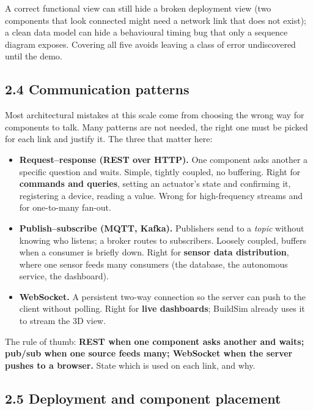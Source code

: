 \documentclass[
  11pt,
]{article}
\providecommand{\tightlist}{%
  \setlength{\itemsep}{0pt}\setlength{\parskip}{0pt}}
\begin{document}
A correct functional view can still hide a broken deployment view (two
components that look connected might need a network link that does not
exist); a clean data model can hide a behavioural timing bug that only a
sequence diagram exposes. Covering all five avoids leaving a
class of error undiscovered until the demo.

\hypertarget{communication-patterns}{%
\subsection{2.4 Communication patterns}\label{communication-patterns}}

Most architectural mistakes at this scale come from choosing the wrong
way for components to talk. Many patterns are not needed, the right one must be picked for each link and justify it. The three that
matter here:

\begin{itemize}
\tightlist
\item
  \textbf{Request--response (REST over HTTP).} One component asks
  another a specific question and waits. Simple, tightly coupled, no
  buffering. Right for \textbf{commands and queries}, setting an
  actuator's state and confirming it, registering a device, reading a
  value. Wrong for high-frequency streams and for one-to-many fan-out.
\item
  \textbf{Publish--subscribe (MQTT, Kafka).} Publishers send to a
  \emph{topic} without knowing who listens; a broker routes to
  subscribers. Loosely coupled, buffers when a consumer is briefly down.
  Right for \textbf{sensor data distribution}, where one sensor feeds
  many consumers (the database, the autonomous service, the dashboard).
\item
  \textbf{WebSocket.} A persistent two-way connection so the server can
  push to the client without polling. Right for \textbf{live
  dashboards}; BuildSim already uses it to stream the 3D view.
\end{itemize}

The rule of thumb: \textbf{REST when one component asks another and
waits; pub/sub when one source feeds many; WebSocket when the server
pushes to a browser.} State which is used on each link, and why.

\hypertarget{deployment-and-component-placement}{%
\subsection{2.5 Deployment and component
placement}\label{deployment-and-component-placement}}
\end{document}
